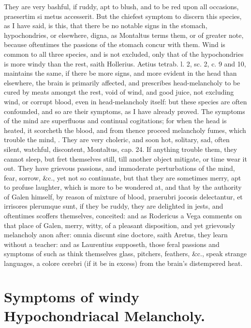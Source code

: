 {They are very bashful, if ruddy, apt to blush, and to be red upon all
occasions, praesertim si metus accesserit. But the chiefest symptom to
discern this species, as I have said, is this, that there be no notable
signs in the stomach, hypochondries, or elsewhere, digna, as 
Montaltus terms them, or of greater note, because oftentimes the
passions of the stomach concur with them. Wind is common to all three
species, and is not excluded, only that of the hypochondries is
more windy than the rest, saith Hollerius. Aetius tetrab. l. 2,
sc. 2, c. 9 and 10, maintains the same, if there be more signs,
and more evident in the head than elsewhere, the brain is primarily
affected, and prescribes head-melancholy to be cured by meats amongst
the rest, void of wind, and good juice, not excluding wind, or corrupt
blood, even in head-melancholy itself: but these species are often
confounded, and so are their symptoms, as I have already proved. The
symptoms of the mind are superfluous and continual cogitations;
for when the head is heated, it scorcheth the blood, and from
thence proceed melancholy fumes, which trouble the mind, \Avicenna{}. They
are very choleric, and soon hot, solitary, sad, often silent, watchful,
discontent, Montaltus, cap. 24. If anything trouble them, they cannot
sleep, but fret themselves still, till another object mitigate, or time
wear it out. They have grievous passions, and immoderate perturbations
of the mind, fear, sorrow, \&c., yet not so continuate, but that they
are sometimes merry, apt to profuse laughter, which is more to be
wondered at, and that by the authority of Galen himself, by
reason of mixture of blood, praerubri jocosis delectantur, et irrisores
plerumque sunt, if they be ruddy, they are delighted in jests, and
oftentimes scoffers themselves, conceited: and as Rodericus a Vega
comments on that place of Galen, merry, witty, of a pleasant
disposition, and yet grievously melancholy anon after: omnia discunt
sine doctore, saith Aretus, they learn without a teacher: and as
Laurentius supposeth, those feral passions and symptoms of such
as think themselves glass, pitchers, feathers, \&c., speak strange
languages, a colore cerebri (if it be in excess) from the brain's
distempered heat.

\section{Symptoms of windy Hypochondriacal Melancholy.}

}
